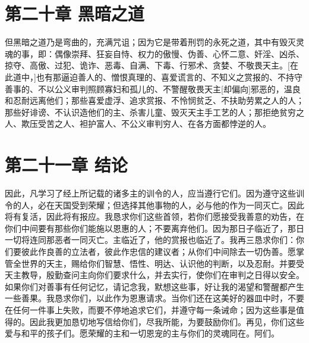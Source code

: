 \section{第二十章 黑暗之道}

但黑暗之道乃是弯曲的，充满咒诅；因为它是带着刑罚的永死之道，其中有毁灭灵魂的事，即：偶像崇拜、狂妄自恃、权力的傲慢、伪善、心怀二意、奸淫、凶杀、掠夺、高傲、过犯、诡诈、恶毒、自满、下毒、行邪术、贪婪、不敬畏天主。[在此道中，]也有那逼迫善人的、憎恨真理的、喜爱谎言的、不知义之赏报的、不持守善事的、不以公义审判照顾寡妇和孤儿的、不警醒敬畏天主[却偏向]邪恶的，温良和忍耐远离他们；那些喜爱虚浮、追求赏报、不怜悯贫乏、不扶助劳累之人的人；那些好诽谤、不认识造他们的主、杀害儿童、毁灭天主手工艺的人；那拒绝贫穷之人、欺压受苦之人、袒护富人、不公义审判穷人、在各方面都悖逆的人。\par


\section{第二十一章 结论}

因此，凡学习了经上所记载的诸多主的训令的人，应当遵行它们。因为遵守这些训令的人，必在天国受到荣耀；但选择其他事物的人，必与他的作为一同灭亡。因此将有复活，因此将有报应。我恳求你们这些首领，若你们愿接受我善意的劝告，在你们中间要有那些你们能施以恩惠的人；不要离弃他们。因为那日子临近了，那日一切将连同那恶者一同灭亡。主临近了，他的赏报也临近了。我再三恳求你们：你们要彼此作良善的立法者，彼此作忠信的建议者；从你们中间除去一切伪善。愿掌管全世界的天主，赐给你们智慧、悟性、明达、认识他的判断，以及忍耐。并要受天主教导，殷勤查问主向你们要求什么，并去实行，使你们在审判之日得以安全。如果你们对善事有任何记忆，请记念我，默想这些事，好让我的渴望和警醒都产生一些善果。我恳求你们，以此作为恩惠请求。当你们还在这美好的器皿中时，不要在任何一件事上失败，而要不停地追求它们，并遵守每一条诫命；因为这些事是值得的。因此我更加恳切地写信给你们，尽我所能，为要鼓励你们。再见，你们这些爱与和平的孩子们。愿荣耀的主和一切恩宠的主与你们的灵魂同在。阿们。\par

